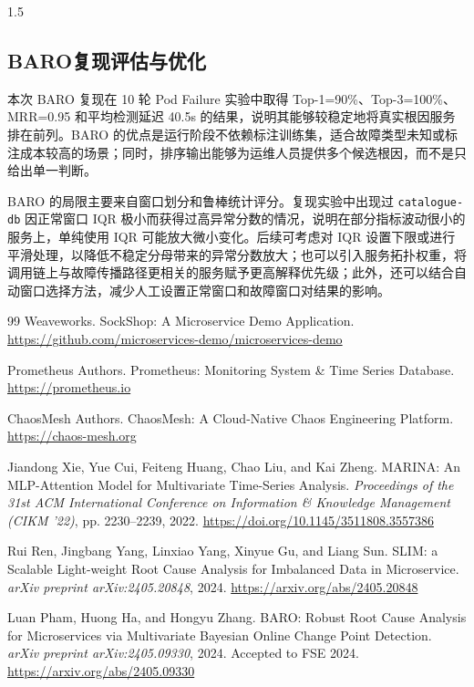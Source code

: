 \documentclass[a4paper,12pt]{report}
\begin{document}
\begin{spacing}{1.5}
\subsection{BARO复现评估与优化}

本次 BARO 复现在 10 轮 Pod Failure 实验中取得 Top-1=90\%、Top-3=100\%、MRR=0.95 和平均检测延迟 40.5s 的结果，说明其能够较稳定地将真实根因服务排在前列。BARO 的优点是运行阶段不依赖标注训练集，适合故障类型未知或标注成本较高的场景；同时，排序输出能够为运维人员提供多个候选根因，而不是只给出单一判断。

BARO 的局限主要来自窗口划分和鲁棒统计评分。复现实验中出现过 \texttt{catalogue-db} 因正常窗口 IQR 极小而获得过高异常分数的情况，说明在部分指标波动很小的服务上，单纯使用 IQR 可能放大微小变化。后续可考虑对 IQR 设置下限或进行平滑处理，以降低不稳定分母带来的异常分数放大；也可以引入服务拓扑权重，将调用链上与故障传播路径更相关的服务赋予更高解释优先级；此外，还可以结合自动窗口选择方法，减少人工设置正常窗口和故障窗口对结果的影响。

\end{spacing}

\begin{thebibliography}{99}
\songti {} 	
	Weaveworks. SockShop: A Microservice Demo Application. \url{https://github.com/microservices-demo/microservices-demo}
	
	Prometheus Authors. Prometheus: Monitoring System \& Time Series Database. \url{https://prometheus.io}
	
	ChaosMesh Authors. ChaosMesh: A Cloud-Native Chaos Engineering Platform. \url{https://chaos-mesh.org}
	
	Jiandong Xie, Yue Cui, Feiteng Huang, Chao Liu, and Kai Zheng. MARINA: An MLP-Attention Model for Multivariate Time-Series Analysis. \emph{Proceedings of the 31st ACM International Conference on Information \& Knowledge Management (CIKM '22)}, pp. 2230--2239, 2022. \url{https://doi.org/10.1145/3511808.3557386}
	
		Rui Ren, Jingbang Yang, Linxiao Yang, Xinyue Gu, and Liang Sun. SLIM: a Scalable Light-weight Root Cause Analysis for Imbalanced Data in Microservice. \emph{arXiv preprint arXiv:2405.20848}, 2024. \url{https://arxiv.org/abs/2405.20848}
		
		Luan Pham, Huong Ha, and Hongyu Zhang. BARO: Robust Root Cause Analysis for Microservices via Multivariate Bayesian Online Change Point Detection. \emph{arXiv preprint arXiv:2405.09330}, 2024. Accepted to FSE 2024. \url{https://arxiv.org/abs/2405.09330}
	
\end{thebibliography}
\end{document}
